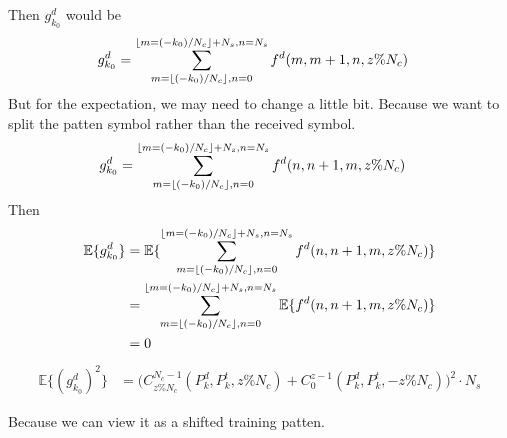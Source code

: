 \documentclass[a4paper]{article}
\begin{document}
Then $g_{k_0}^d$ would be 
\begin{align}
	g^d_{k_0}
	&= \sum_{m = \lfloor(-k_0)/N_c\rfloor, n = 0}^{\lfloor m=(-k_0)/N_c\rfloor + N_s, n = N_s} f^d(m, m+1, n, z\%N_c)
\end{align}
But for the expectation, we may need to change a little bit. Because we want to split the patten symbol rather than the received symbol.
\begin{align}
	g^d_{k_0}
	&= \sum_{m = \lfloor(-k_0)/N_c\rfloor, n = 0}^{\lfloor m=(-k_0)/N_c\rfloor + N_s, n = N_s} f^d(n, n+1, m, z\%N_c)
\end{align}
Then
\begin{align}
	\mathbb{E}\{g^d_{k_0}\} 
	&= \mathbb{E}\{\sum_{m = \lfloor(-k_0)/N_c\rfloor, n = 0}^{\lfloor m=(-k_0)/N_c\rfloor + N_s, n = N_s} f^d(n, n+1, m, z\%N_c)\}\\
	&= \sum_{m = \lfloor(-k_0)/N_c\rfloor, n = 0}^{\lfloor m=(-k_0)/N_c\rfloor + N_s, n = N_s} \mathbb{E}\{f^d(n, n+1, m, z\%N_c)\}\\
	&= 0
\end{align}
\begin{align}
	\mathbb{E} \{(g^d_{k_0})^2\}
	&= \bigg(C_{z\%N_c}^{N_c-1}(P^d_k, P^t_k, z\%N_c) + C_0^{z-1}(P^d_k, P^t_k, -z\%N_c)\bigg)^2 \cdot N_s
\end{align}

Because we can view it as a shifted training patten.




% 
% 
\end{document}
